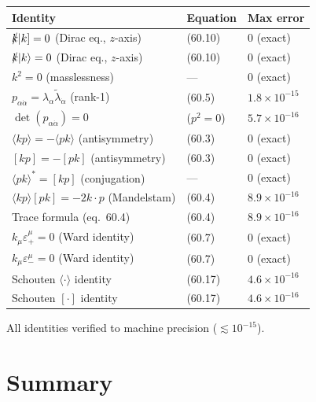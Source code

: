\documentclass[12pt]{article}
\begin{document}
\begin{center}
\renewcommand{\arraystretch}{1.5}
\begin{tabular}{@{}lll@{}}
  \toprule
  Identity & Equation & Max error \\
  \midrule
  $\slashed{k}|k] = 0$ (Dirac eq., $z$-axis)
    & (60.10) & $0$ (exact) \\
  $\slashed{k}|k\rangle = 0$ (Dirac eq., $z$-axis)
    & (60.10) & $0$ (exact) \\
  $k^2 = 0$ (masslessness)
    & --- & $0$ (exact) \\
  $p_{\alpha\dot\alpha} = \lambda_\alpha\tilde\lambda_{\dot\alpha}$ (rank-1)
    & (60.5) & $1.8\times10^{-15}$ \\
  $\det(p_{\alpha\dot\alpha}) = 0$
    & ($p^2=0$) & $5.7\times10^{-16}$ \\
  $\langle kp\rangle = -\langle pk\rangle$ (antisymmetry)
    & (60.3) & $0$ (exact) \\
  $[kp] = -[pk]$ (antisymmetry)
    & (60.3) & $0$ (exact) \\
  $\langle pk\rangle^* = [kp]$ (conjugation)
    & --- & $0$ (exact) \\
  $\langle kp\rangle[pk] = -2k\cdot p$ (Mandelstam)
    & (60.4) & $8.9\times10^{-16}$ \\
  Trace formula (eq.~60.4)
    & (60.4) & $8.9\times10^{-16}$ \\
  $k_\mu\varepsilon_+^\mu = 0$ (Ward identity)
    & (60.7) & $0$ (exact) \\
  $k_\mu\varepsilon_-^\mu = 0$ (Ward identity)
    & (60.7) & $0$ (exact) \\
  Schouten $\langle\cdot\rangle$ identity
    & (60.17) & $4.6\times10^{-16}$ \\
  Schouten $[\cdot]$ identity
    & (60.17) & $4.6\times10^{-16}$ \\
  \bottomrule
\end{tabular}
\end{center}

All identities verified to machine precision ($\lesssim 10^{-15}$).

\section{Summary}
\end{document}
